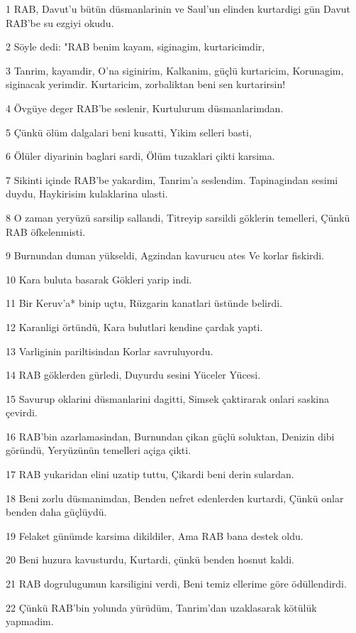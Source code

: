 \par 1 RAB, Davut'u bütün düsmanlarinin ve Saul'un elinden kurtardigi gün Davut RAB'be su ezgiyi okudu.
\par 2 Söyle dedi: "RAB benim kayam, siginagim, kurtaricimdir,
\par 3 Tanrim, kayamdir, O'na siginirim, Kalkanim, güçlü kurtaricim, Korunagim, siginacak yerimdir. Kurtaricim, zorbaliktan beni sen kurtarirsin!
\par 4 Övgüye deger RAB'be seslenir, Kurtulurum düsmanlarimdan.
\par 5 Çünkü ölüm dalgalari beni kusatti, Yikim selleri basti,
\par 6 Ölüler diyarinin baglari sardi, Ölüm tuzaklari çikti karsima.
\par 7 Sikinti içinde RAB'be yakardim, Tanrim'a seslendim. Tapinagindan sesimi duydu, Haykirisim kulaklarina ulasti.
\par 8 O zaman yeryüzü sarsilip sallandi, Titreyip sarsildi göklerin temelleri, Çünkü RAB öfkelenmisti.
\par 9 Burnundan duman yükseldi, Agzindan kavurucu ates Ve korlar fiskirdi.
\par 10 Kara buluta basarak Gökleri yarip indi.
\par 11 Bir Keruv'a* binip uçtu, Rüzgarin kanatlari üstünde belirdi.
\par 12 Karanligi örtündü, Kara bulutlari kendine çardak yapti.
\par 13 Varliginin pariltisindan Korlar savruluyordu.
\par 14 RAB göklerden gürledi, Duyurdu sesini Yüceler Yücesi.
\par 15 Savurup oklarini düsmanlarini dagitti, Simsek çaktirarak onlari saskina çevirdi.
\par 16 RAB'bin azarlamasindan, Burnundan çikan güçlü soluktan, Denizin dibi göründü, Yeryüzünün temelleri açiga çikti.
\par 17 RAB yukaridan elini uzatip tuttu, Çikardi beni derin sulardan.
\par 18 Beni zorlu düsmanimdan, Benden nefret edenlerden kurtardi, Çünkü onlar benden daha güçlüydü.
\par 19 Felaket günümde karsima dikildiler, Ama RAB bana destek oldu.
\par 20 Beni huzura kavusturdu, Kurtardi, çünkü benden hosnut kaldi.
\par 21 RAB dogrulugumun karsiligini verdi, Beni temiz ellerime göre ödüllendirdi.
\par 22 Çünkü RAB'bin yolunda yürüdüm, Tanrim'dan uzaklasarak kötülük yapmadim.
